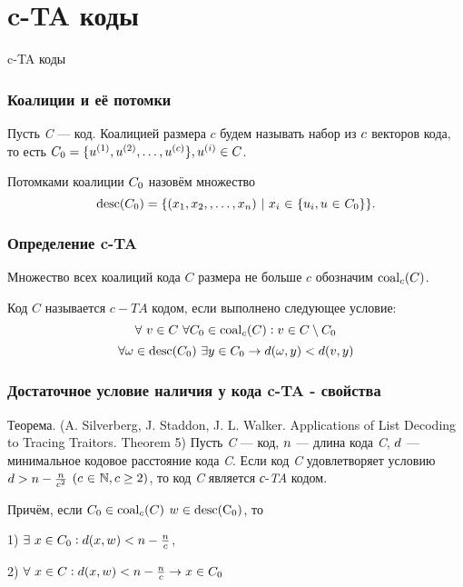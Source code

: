 \documentclass{beamer}
\begin{document}
\section {c-TA коды}

\begin {frame}
\tableofcontents[currentsection]
\end {frame}

\begin {frame}  { c-TA коды }
\frametitle {Коалиции и её потомки}

Пусть {\sl C} --- код. Коалицией размера $c$ будем называть набор из ${\sl c}$ векторов кода, то есть
${\sl C_0} = \{ u^{(1)}, u^{(2)} , \dots , u^{(c)}\},  u^{(i)} \in {\sl C}$.
\newline

Потомками  коалиции ${\sl C_0}$ назовём множество
$$ {\rm desc}({\sl C_0})=\{(x_1, x_2, , \dots , x_n) \ | \  {\sl x_i} \ {\in} \ \{ u_i , u \ {\in} \
 {\sl C_0}\}\}.$$

\end {frame}

\begin {frame}
\frametitle {Определение c-TA}
Множество всех коалиций кода $C$ размера не больше $c$ обозначим ${\rm coal}_c(C)$.

Код $C$ называется $c-TA$ кодом, если выполнено следующее условие: $$ \forall \ v \in C \ \forall C_0 \in {\rm coal}_c(C) : v \in C \setminus C_0 $$
 $$ \forall \omega \in {\rm desc}(C_0) \  \exists y \in C_0 \to d(\omega, y) < d(v,y) $$
\end {frame}

\begin {frame}
\frametitle {Достаточное условие наличия у кода c-TA - свойства}
\begin {block} {Теорема. (A. Silverberg, J. Staddon, J. L. Walker. Applications of List Decoding to Tracing Traitors. Theorem 5)}
Пусть {\sl C} --- код, ${\sl n}$ --- длина кода {\sl C}, ${\sl d}$ --- минимальное кодовое расстояние кода {\sl C}.
 Если код {\sl C} удовлетворяет условию $ {\sl d} > {\sl n} - \frac {\sl n}{\sl c^2}$  $ ({\sl c} \ {\in} \  {\mathbb N}, {\sl c} \geq 2)$, то  код {\sl C} является {\sl с}-{\sl TA} кодом.

Причём, если ${\sl C_0} \in {\rm coal}_c(C)$   ${\sl w} \in {\rm desc(C_0)}$, то

1) $\exists \ {\sl x} \in {\sl C_0} : {\sl d}({\sl x}, {\sl w}) < {\sl n} - \frac {\sl n}{\sl c}$,

2) $ \forall \ {\sl x} \in {\sl C} : {\sl d}({\sl x}, {\sl w}) < {\sl n} - \frac {\sl n}{\sl c} \to {\sl x} \in {\sl C_0}$
\end {block}
\end {frame}
\end{document}
